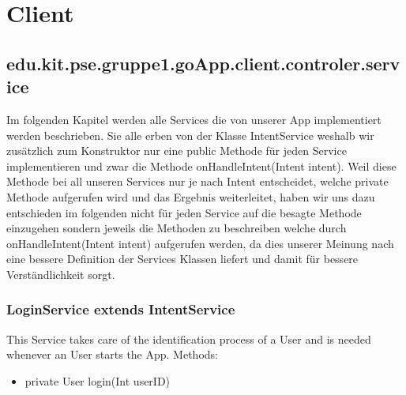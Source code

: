 
\section{Client} 
	\hypertarget{controler.service}{}
	\subsection{edu.kit.pse.gruppe1.goApp.client.controler.service}
	Im folgenden Kapitel werden alle Services die von unserer App implementiert werden beschrieben.
	Sie alle erben von der Klasse IntentService weshalb wir zusätzlich zum Konstruktor nur eine public Methode für jeden Service implementieren und zwar die Methode onHandleIntent(Intent intent).
	Weil diese Methode bei all unseren Services nur je nach Intent entscheidet, welche private Methode aufgerufen wird und das Ergebnis weiterleitet, haben wir uns dazu entschieden im folgenden nicht für jeden Service auf die besagte Methode einzugehen sondern jeweils die Methoden zu beschreiben welche durch onHandleIntent(Intent intent) aufgerufen werden, da dies unserer Meinung nach eine bessere Definition der Services Klassen liefert und damit für bessere Verständlichkeit sorgt. 
	
	\subsubsection {LoginService extends IntentService}
		This Service takes care of the identification process of a User and is needed whenever an User starts the App.
	\newline Methods:
	\begin{itemize}
	\item private User login(Int userID)
	\end{itemize}
	
